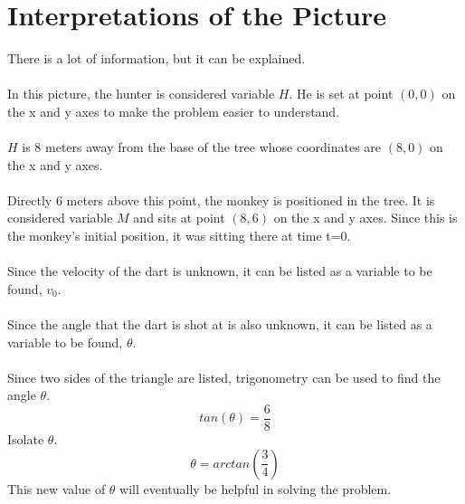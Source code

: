 \documentclass[12pt]{article}
\begin{document}
\section{Interpretations of the Picture}
There is a lot of information, but it can be explained.\\\\
In this picture, the hunter is considered variable $H$. He is set at point $(0,0)$ on the x and y axes to make the problem easier to understand. \\\\
$H$ is 8 meters away from the base of the tree whose coordinates are $(8,0)$ on the x and y axes.\\\\
Directly 6 meters above this point, the monkey is positioned in the tree. It is considered variable $M$ and sits at point $(8,6)$ on the x and y axes. Since this is the monkey's initial position, it was sitting there at time t=0.\\\\
Since the velocity of the dart is unknown, it can be listed as a variable to be found, $v_0$.\\\\
Since the angle that the dart is shot at is also unknown, it can be listed as a variable to be found, $\theta$.\\\\
Since two sides of the triangle are listed, trigonometry can be used to find the angle $\theta$.
$$tan(\theta)=\frac{6}{8}$$
Isolate $\theta$.
$$\theta=arctan(\frac{3}{4})$$
This new value of $\theta$ will eventually be helpful in solving the problem.
\end{document}
